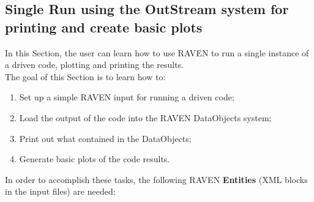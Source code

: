 \subsection{Single Run using the OutStream system for printing and create basic plots}
\label{sub:SingleRunBasicPlots}
 In this Section, the user can learn how to use RAVEN to run a single instance of a driven code, plotting and printing the 
 results.
 \\ The goal of this Section is to learn how to:
 \begin{enumerate}
   \item Set up a simple RAVEN input for running a driven code;
   \item Load the output of the code into the RAVEN DataObjects system;
   \item Print out what contained in the DataObjects;
   \item Generate basic plots of the code results.
\end{enumerate}  
In order to accomplish these tasks, the following RAVEN \textbf{Entities} (XML blocks in the input files) are needed:
